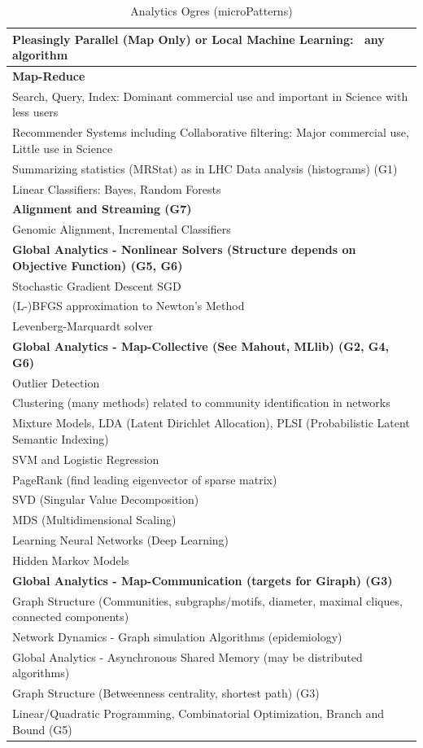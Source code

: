 \documentclass{acm_proc_article-sp}
\begin{document}
\begin{table}[H]
\centering
\caption{Analytics Ogres (microPatterns)}
\label{Table9}
\begin{tabular}{|p{8cm}|} \hline

\textbf{Pleasingly Parallel (Map Only) or Local Machine Learning: ~any algorithm} \\ \hline 
\textbf{Map-Reduce} \\ \hline
Search, Query, Index: Dominant commercial use and important in Science with less users \\ \hline
Recommender Systems including Collaborative filtering: Major commercial use, Little use in Science \\ \hline
Summarizing statistics (MRStat) as in LHC Data analysis (histograms) (G1) \\ \hline
Linear Classifiers: Bayes, Random Forests \\ \hline
\textbf{Alignment and Streaming (G7)} \\ \hline
Genomic Alignment, Incremental Classifiers \\ \hline
\textbf{Global Analytics - Nonlinear Solvers (Structure depends on Objective Function) (G5, G6)} \\ \hline
Stochastic Gradient Descent SGD \\ \hline
(L-)BFGS approximation to Newton's Method \\ \hline
Levenberg-Marquardt solver \\ \hline
\textbf{Global Analytics - Map-Collective (See Mahout, MLlib) (G2, G4, G6)} \\ \hline
Outlier Detection \\ \hline
Clustering (many methods) related to community identification in networks \\ \hline
Mixture Models, LDA (Latent Dirichlet Allocation), PLSI (Probabilistic Latent Semantic Indexing)\\ \hline
SVM and Logistic Regression\\ \hline
PageRank (find leading eigenvector of sparse matrix)\\ \hline
SVD (Singular Value Decomposition)\\ \hline
MDS (Multidimensional Scaling)\\ \hline
Learning Neural Networks (Deep Learning)\\ \hline
Hidden Markov Models\\ \hline
\textbf{Global Analytics - Map-Communication (targets for Giraph) (G3)}\\ \hline
Graph Structure (Communities, subgraphs/motifs, diameter, maximal cliques, connected components)\\ \hline
Network Dynamics - Graph simulation Algorithms (epidemiology)\\ \hline
Global Analytics - Asynchronous Shared Memory (may be distributed algorithms)\\ \hline
Graph Structure (Betweenness centrality, shortest path) (G3)\\ \hline
Linear/Quadratic Programming, Combinatorial Optimization, Branch and Bound (G5)
\\ \hline
\end{tabular}
\end{table}
\end{document}
